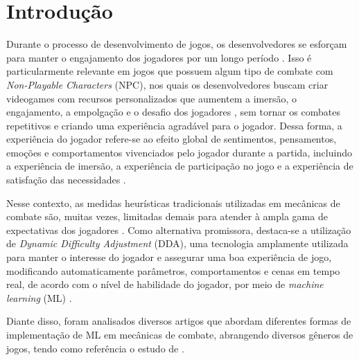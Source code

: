 \section{Introdução}
    Durante o processo de desenvolvimento de jogos, os
    desenvolvedores se esforçam para manter 
    o engajamento dos jogadores por um longo período 
    \cite{przybylski2010motivational}.
    Isso é particularmente relevante em jogos que possuem 
    algum tipo de combate com 
    \textit{Non-Playable Characters} (NPC), nos quais os
    desenvolvedores buscam criar videogames com recursos
    personalizados que aumentem a imersão, o engajamento,
    a empolgação e o desafio dos jogadores 
    \cite{bontchev2016adaptation}, sem tornar os combates
    repetitivos e criando uma experiência agradável 
    para o jogador. Dessa forma, a experiência do jogador 
    refere-se ao efeito global de sentimentos, 
    pensamentos, emoções e comportamentos vivenciados
    pelo jogador durante a partida, incluindo a 
    experiência de imersão, a experiência de 
    participação no jogo e a experiência de satisfação das 
    necessidades 
    \cite{wiemeyer2016player,denisova2016convergence}.
    
    Nesse contexto, as medidas heurísticas tradicionais
    utilizadas em mecânicas de combate são, muitas 
    vezes, limitadas demais para atender à ampla 
    gama de expectativas dos jogadores 
    \cite{moon2022diversifying}. Como alternativa
    promissora, destaca-se a utilização de 
    \textit{Dynamic Difficulty Adjustment} (DDA), 
    uma tecnologia amplamente utilizada para manter
    o interesse do jogador e assegurar uma boa experiência 
    de jogo, modificando automaticamente parâmetros, 
    comportamentos e cenas em tempo real, de acordo com o 
    nível de habilidade do jogador, por meio de 
    \textit{machine learning} (ML) \cite{mi2022improved}.

    Diante disso, foram analisados diversos artigos que 
    abordam diferentes formas de implementação de 
    ML em mecânicas de combate, abrangendo diversos 
    gêneros de jogos, tendo como referência
    o estudo de \cite{mortazavi2024dynamic}.
    
    

    